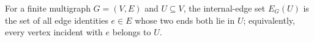 \begin{definition}
For a finite multigraph $G=(V,E)$ and $U\subseteq V$, the internal-edge set
$E_G(U)$ is the set of all edge identities $e\in E$ whose two ends both lie
in $U$; equivalently, every vertex incident with $e$ belongs to $U$.
\end{definition}

